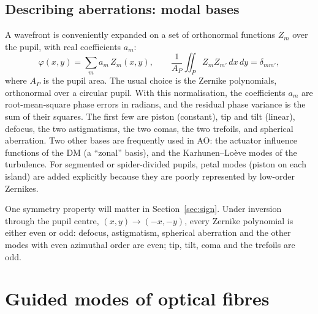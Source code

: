 \documentclass[11pt,a4paper]{article}
\begin{document}
\subsection{Describing aberrations: modal bases}
A wavefront is conveniently expanded on a set of orthonormal functions $Z_m$ over the pupil, with real coefficients $a_m$:
\begin{equation}
\varphi(x,y) = \sum_m a_m\, Z_m(x,y),
\qquad
\frac{1}{A_P} \iint_P Z_m Z_{m'}\, dx\, dy = \delta_{m m'},
\label{eq:zernike}
\end{equation}
where $A_P$ is the pupil area. The usual choice is the Zernike polynomials, orthonormal over a circular pupil. With this normalisation, the coefficients $a_m$ are root-mean-square phase errors in radians, and the residual phase variance is the sum of their squares. The first few are piston (constant), tip and tilt (linear), defocus, the two astigmatisms, the two comas, the two trefoils, and spherical aberration. Two other bases are frequently used in AO: the actuator influence functions of the DM (a ``zonal'' basis), and the Karhunen--Lo\`eve modes of the turbulence. For segmented or spider-divided pupils, petal modes (piston on each island) are added explicitly because they are poorly represented by low-order Zernikes.

One symmetry property will matter in Section~\ref{sec:sign}. Under inversion through the pupil centre, $(x,y) \to (-x,-y)$, every Zernike polynomial is either even or odd: defocus, astigmatism, spherical aberration and the other modes with even azimuthal order are even; tip, tilt, coma and the trefoils are odd.

\section{Guided modes of optical fibres}
\end{document}
